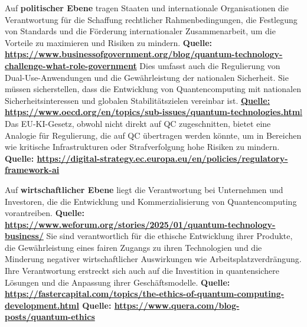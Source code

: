 Auf \textbf{politischer Ebene} tragen Staaten und internationale Organisationen die Verantwortung für die Schaffung rechtlicher Rahmenbedingungen, die Festlegung von Standards und die Förderung internationaler Zusammenarbeit, um die Vorteile zu maximieren und Risiken zu mindern. \textbf{Quelle: \href{https://www.businessofgovernment.org/blog/quantum-technology-challenge-what-role-government}{https://www.businessofgovernment.org/blog/quantum-technology-challenge-what-role-government}} Dies umfasst auch die Regulierung von Dual-Use-Anwendungen und die Gewährleistung der nationalen Sicherheit. Sie müssen sicherstellen, dass die Entwicklung von Quantencomputing mit nationalen Sicherheitsinteressen und globalen Stabilitätszielen vereinbar ist. \href{https://www.oecd.org/en/topics/sub-issues/quantum-technologies.html}{\textbf{Quelle: https://www.oecd.org/en/topics/sub-issues/quantum-technologies.htm}l} Das EU-KI-Gesetz, obwohl nicht direkt auf QC zugeschnitten, bietet eine Analogie für Regulierung, die auf QC übertragen werden könnte, um in Bereichen wie kritische Infrastrukturen oder Strafverfolgung hohe Risiken zu mindern.\textbf{ Quelle: \href{https://digital-strategy.ec.europa.eu/en/policies/regulatory-framework-ai}{https://digital-strategy.ec.europa.eu/en/policies/regulatory-framework-ai}}

Auf \textbf{wirtschaftlicher Ebene} liegt die Verantwortung bei  Unternehmen und Investoren, die die Entwicklung und Kommerzialisierung von Quantencomputing vorantreiben. \textbf{Quelle: \href{https://www.weforum.org/stories/2025/01/quantum-technology-business/}{https://www.weforum.org/stories/2025/01/quantum-technology-business/}} Sie sind verantwortlich für die ethische Entwicklung ihrer Produkte, die Gewährleistung eines fairen Zugangs zu ihren Technologien und die Minderung negativer wirtschaftlicher Auswirkungen wie Arbeitsplatzverdrängung.  Ihre Verantwortung erstreckt sich auch auf die Investition in quantensichere Lösungen und die Anpassung ihrer Geschäftsmodelle.
\textbf{Quelle: \href{https://fastercapital.com/topics/the-ethics-of-quantum-computing-development.html}{https://fastercapital.com/topics/the-ethics-of-quantum-computing-development.html}
Quelle: \href{https://www.quera.com/blog-posts/quantum-ethics}{https://www.quera.com/blog-posts/quantum-ethics}}

